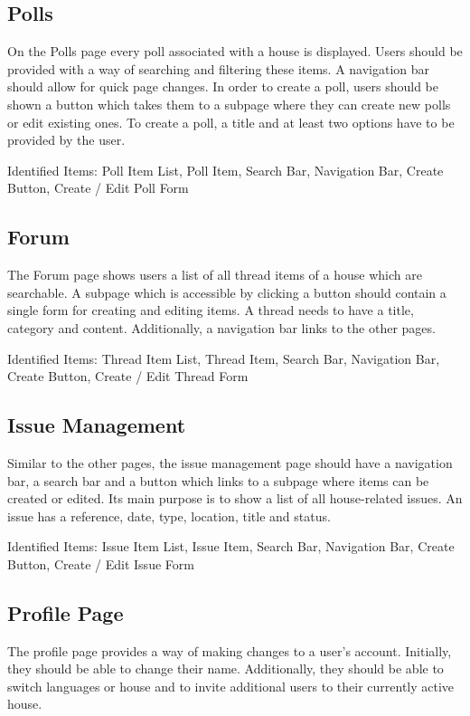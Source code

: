 \subsection{Polls}
On the Polls page every poll associated with a house is displayed. Users should be provided with a way of searching and filtering these items. A navigation bar should allow for quick page changes. In order to create a poll, users should be shown a button which takes them to a subpage where they can create new polls or edit existing ones. To create a poll, a title and at least two options have to be provided by the user.

Identified Items: Poll Item List, Poll Item, Search Bar, Navigation Bar, Create Button, Create / Edit Poll Form

\subsection{Forum}
The Forum page shows users a list of all thread items of a house which are searchable. A subpage which is accessible by clicking a button should contain a single form for creating and editing items. A thread needs to have a title, category and content. Additionally, a navigation bar links to the other pages.

Identified Items: Thread Item List, Thread Item, Search Bar, Navigation Bar, Create Button, Create / Edit Thread Form

\subsection{Issue Management}
Similar to the other pages, the issue management page should have a navigation bar, a search bar and a button which links to a subpage where items can be created or edited. Its main purpose is to show a list of all house-related issues. An issue has a reference, date, type, location, title and status.

Identified Items: Issue Item List, Issue Item, Search Bar, Navigation Bar, Create Button, Create / Edit Issue Form

\subsection{Profile Page}
The profile page provides a way of making changes to a user's account. Initially, they should be able to change their name. Additionally, they should be able to switch languages or house and to invite additional users to their currently active house. \newline

